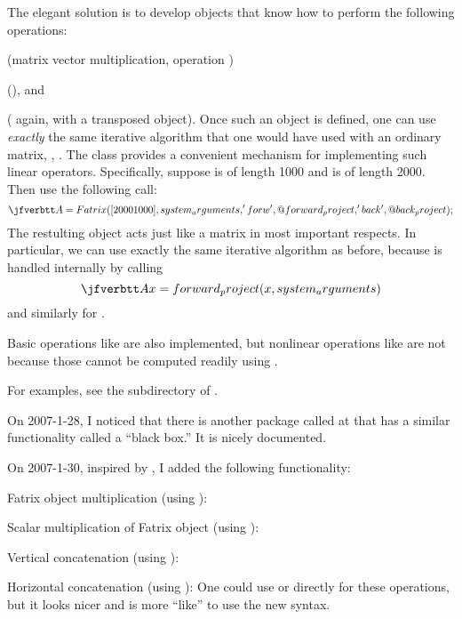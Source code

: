 The elegant solution
is to develop \matlab objects
that know how to perform
the following operations:
\blist
\item
{}
(matrix vector multiplication,
operation )
\item
{}
(), and
\item
{}
( again,
with a transposed object).
\elist
Once such an object is
defined,
one can use \emph{exactly}
the same iterative algorithm
that one would have used
with an ordinary matrix,
\eg,
.
%
The \fatrix class
provides a convenient mechanism
for implementing
such linear operators.
%
Specifically,
suppose \x is of length 1000
and \y is of length 2000.
Then use the following call:
\[
\ty{
A = Fatrix([2000 1000], system_arguments,
 'forw', @forward_project, 'back', @back_project);
}
\]
The restulting \fatrix object 
acts just like a matrix
in most important respects.
In particular,
we can use exactly the same iterative algorithm
 as before,
because
is handled internally
by calling
\[
\ty{
Ax = forward_project(x, system_arguments)
}
\]
and similarly for
.

Basic operations
like 
are also implemented,
but nonlinear operations
like 
are not
because those cannot be computed readily
using . 

For examples, see
the  subdirectory of \irt.

On 2007-1-28,
I noticed that there is another package called 
at 
that has a similar functionality called a ``black box.''
It is nicely documented.

On 2007-1-30,
inspired by ,
I added the following functionality:
\blist
\item
Fatrix object multiplication
(using ): 
\item
Scalar multiplication of Fatrix object
(using ): 
\item
Vertical concatenation (using ):
\item
Horizontal concatenation (using ):
\elist
One could use  or 
directly for these operations,
but it looks nicer
and is more ``\matlab like''
to use the new syntax.

